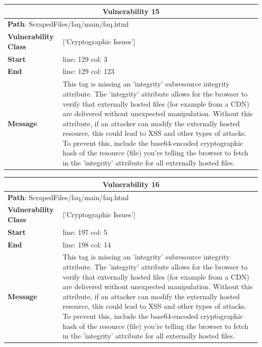 \documentclass[12pt]{article}
\begin{document}
\vspace{0.7cm}
\FloatBarrier
\begin{table}[!h]
\centering
\renewcommand{\arraystretch}{1.3}
\begin{tabular}{|l|p{10cm}|}
\hline
\multicolumn{2}{|c|}{\textbf{Vulnerability 15}} \\
\hline
\multicolumn{2}{|l|}{\textbf{Path}: ScrapedFiles/faq/main/faq.html} \\
\hline
\textbf{Vulnerability Class} & ['Cryptographic Issues'] \\
\hline
\textbf{Start} & line: 129 \quad col: 3 \\
\hline
\textbf{End} & line: 129 \quad col: 123 \\
\hline
\textbf{Message} & This tag is missing an 'integrity' subresource integrity attribute. The 'integrity' attribute allows for the browser to verify that externally hosted files (for example from a CDN) are delivered without unexpected manipulation. Without this attribute, if an attacker can modify the externally hosted resource, this could lead to XSS and other types of attacks. To prevent this, include the base64-encoded cryptographic hash of the resource (file) you're telling the browser to fetch in the 'integrity' attribute for all externally hosted files. \\
\hline
\end{tabular}
\end{table}
\vspace{0.7cm}
\FloatBarrier
\begin{table}[!h]
\centering
\renewcommand{\arraystretch}{1.3}
\begin{tabular}{|l|p{10cm}|}
\hline
\multicolumn{2}{|c|}{\textbf{Vulnerability 16}} \\
\hline
\multicolumn{2}{|l|}{\textbf{Path}: ScrapedFiles/faq/main/faq.html} \\
\hline
\textbf{Vulnerability Class} & ['Cryptographic Issues'] \\
\hline
\textbf{Start} & line: 197 \quad col: 5 \\
\hline
\textbf{End} & line: 198 \quad col: 14 \\
\hline
\textbf{Message} & This tag is missing an 'integrity' subresource integrity attribute. The 'integrity' attribute allows for the browser to verify that externally hosted files (for example from a CDN) are delivered without unexpected manipulation. Without this attribute, if an attacker can modify the externally hosted resource, this could lead to XSS and other types of attacks. To prevent this, include the base64-encoded cryptographic hash of the resource (file) you're telling the browser to fetch in the 'integrity' attribute for all externally hosted files. \\
\hline
\end{tabular}
\end{table}
\end{document}
